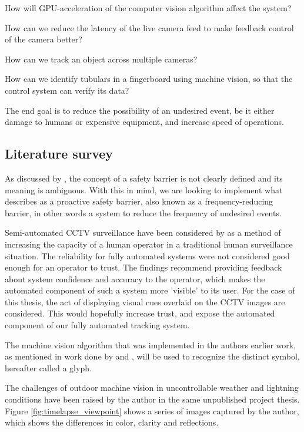 How will GPU-acceleration of the computer vision algorithm affect the system?

How can we reduce the latency of the live camera feed to make feedback control of the camera better?

How can we track an object across multiple cameras?

How can we identify tubulars in a fingerboard using machine vision, so that the control system can verify its data?

The end goal is to reduce the possibility of an undesired event, be it either damage to humans or expensive equipment, and increase speed of operations.

\subsection{Literature survey}
As discussed by \citet{sklet05}, the concept of a safety barrier is not clearly defined and its meaning is ambiguous. With this in mind, we are looking to implement what \citet{rausand14} describes as a proactive safety barrier, also known as a frequency-reducing barrier, in other words a system to reduce the frequency of undesired events.

Semi-automated CCTV surveillance have been considered by \citet{dadashi12} as a method of increasing the capacity of a human operator in a traditional human surveillance situation. The reliability for fully automated systems were not considered good enough for an operator to trust. The findings recommend providing feedback about system confidence and accuracy to the operator, which makes the automated component of such a system more 'visible' to its user. For the case of this thesis, the act of displaying visual cues overlaid on the CCTV images are considered. This would hopefully increase trust, and expose the automated component of our fully automated tracking system.

The machine vision algorithm that was implemented in the authors earlier work, as mentioned in work done by \citet{boyers13} and \citet{kirillov10}, will be used to recognize the distinct symbol, hereafter called a glyph.

The challenges of outdoor machine vision in uncontrollable weather and lightning conditions have been raised by the author in the same unpublished project thesis. Figure \ref{fig:timelapse_viewpoint} shows a series of images captured by the author, which shows the differences in color, clarity and reflections.

